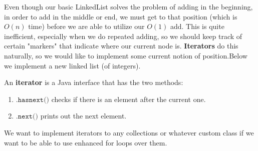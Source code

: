   Even though our basic LinkedList solves the problem of adding in the beginning, in order to add in the middle or end, we must get to that position (which is $O(n)$ time) before we are able to utilize our $O(1)$ add. This is quite inefficient, especially when we do repeated adding, so we should keep track of certain "markers" that indicate where our current node is. \textbf{Iterators} do this naturally, so we would like to implement some current notion of position.Below we implement a new linked list (of integers). 

  \begin{definition}[Iterator]
  An \textbf{iterator} is a Java interface that has the two methods: 
  \begin{enumerate}
      \item $\texttt{.hasnext()}$ checks if there is an element after the current one. 
      \item $\texttt{.next()}$ prints out the next element. 
  \end{enumerate}
  We want to implement iterators to any collections or whatever custom class if we want to be able to use enhanced for loops over them. 
  \end{definition}


